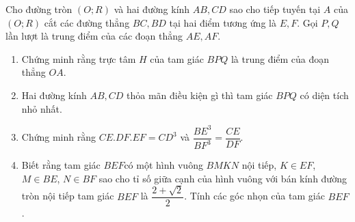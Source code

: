 \begin{ex}%
Cho đường tròn $(O;R)$ và hai đường kính $AB, CD$ sao cho tiếp tuyến tại $A$ của $(O;R)$ cắt các đường thẳng $BC, BD$ tại hai điểm tương ứng là $E,F$. Gọi $P,Q$ lần lượt là trung điểm của các đoạn thẳng $AE,AF$. 
\begin{enumerate}
\item Chứng minh rằng trực tâm $H$ của tam giác $BPQ$ là trung điểm của đoạn thẳng $OA$.
\item Hai đường kính $AB, CD$ thỏa mãn điều kiện gì thì tam giác $BPQ$ có diện tích nhỏ nhất.
\item Chứng minh rằng $CE.DF.EF=CD^3$ và $\dfrac{BE^3}{BF^3}=\dfrac{CE}{DF}$.
\item Biết rằng tam giác $BEF$có một hình vuông $BMKN$ nội tiếp, $K\in EF$, $M\in BE$, $N\in BF$ sao cho tỉ số giữa cạnh của hình vuông với bán kính đường tròn nội tiếp tam giác $BEF$ là $\dfrac{2+\sqrt{2}}{2}$. Tính các góc nhọn của tam giác $BEF$.
\end{enumerate}
\end{ex}
